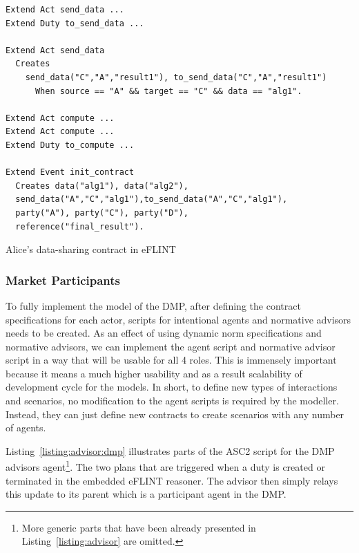 \begin{listing}[h]
\centering
\begin{tcolorbox}[left=2pt,right=2pt,top=2pt,bottom=2pt,arc=0pt,
                  boxrule=0pt,toprule=1pt,
                  colback=white]
\begin{verbatim}
Extend Act send_data ...
Extend Duty to_send_data ...

Extend Act send_data
  Creates 
    send_data("C","A","result1"), to_send_data("C","A","result1")
      When source == "A" && target == "C" && data == "alg1".

Extend Act compute ...
Extend Act compute ...
Extend Duty to_compute ...

Extend Event init_contract
  Creates data("alg1"), data("alg2"),
  send_data("A","C","alg1"),to_send_data("A","C","alg1"),
  party("A"), party("C"), party("D"),
  reference("final_result").
\end{verbatim}
\end{tcolorbox}
\caption{Alice's data-sharing contract in eFLINT}
\label{listing:eflint:dmp-alice}
\end{listing}

\subsubsection{Market Participants}
To fully implement the model of the DMP, after defining the contract specifications for each actor, scripts for intentional agents and normative advisors needs to be created. As an effect of using dynamic norm specifications and normative advisors, we can implement the agent script and normative advisor script in a way that will be usable for all 4 roles. This is immensely important because it means a much higher usability and as a result scalability of development cycle for the models. In short, to define new types of interactions and scenarios, no modification to the agent scripts is required by the modeller. Instead, they can just define new contracts to create scenarios with any number of agents. 


Listing~\ref{listing:advisor:dmp} illustrates parts of the ASC2 script for the DMP advisors agent\footnote{More generic parts that have been already presented in Listing~\ref{listing:advisor} are omitted.}. The two plans that are triggered when a duty  is created or terminated in the embedded eFLINT reasoner. The advisor then simply relays this update to its parent which is a participant agent in the DMP.

